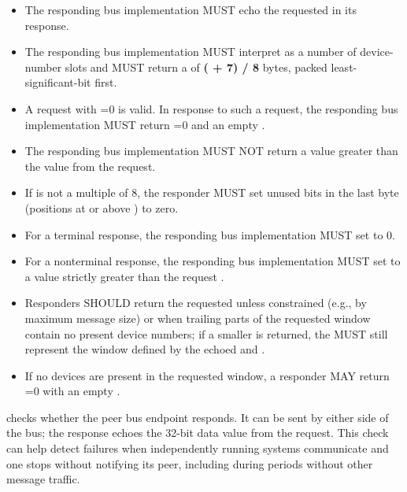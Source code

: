 \begin{itemize}
  \item The responding bus implementation MUST echo the requested
         in its response.
  \item The responding bus implementation MUST interpret  as a
        number of device-number slots and MUST return a  of
        \textbf{( + 7) / 8} bytes, packed least-significant-bit
        first.
  \item A request with =0 is valid. In response to such a request,
        the responding bus implementation MUST return =0 and an
        empty .
  \item The responding bus implementation MUST NOT return a  value
        greater than the  value from the request.
  \item If  is not a multiple of 8, the responder MUST set unused
        bits in the last  byte (positions at or above
        ) to zero.
  \item For a terminal response, the responding bus implementation MUST set
         to 0.
  \item For a nonterminal response, the responding bus implementation MUST set
         to a value strictly greater than the request
        .
  \item Responders SHOULD return the requested  unless constrained
        (e.g., by maximum message size) or when trailing parts of the requested
        window contain no present device numbers; if a smaller  is
        returned, the  MUST still represent the window defined by
        the echoed  and .
  \item If no devices are present in the requested window, a responder MAY
        return =0 with an empty .
\end{itemize}


 checks whether the peer bus endpoint responds. It can be sent by
either side of the bus; the response echoes the 32-bit data value from the
request. This check can help detect failures when independently running systems
communicate and one stops without notifying its peer, including during periods
without other message traffic.

